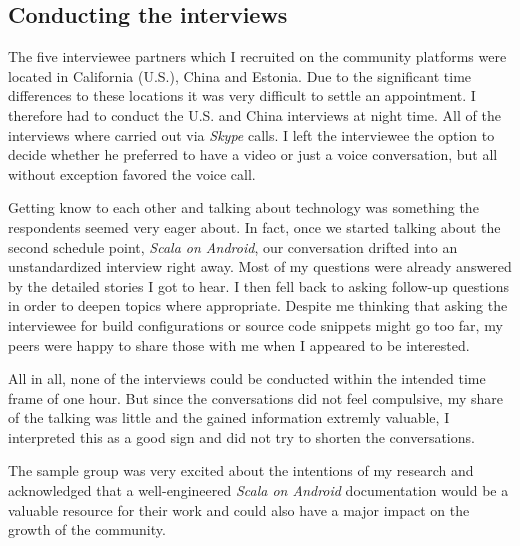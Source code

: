 \subsection{Conducting the interviews}

The five interviewee partners which I recruited on the community platforms were located in California (U.S.), China and Estonia. Due to the significant time differences to these locations it was very difficult to settle an appointment. I therefore had to conduct the U.S. and China interviews at night time. All of the interviews where carried out via \textit{Skype} calls. I left the interviewee the option to decide whether he preferred to have a video or just a voice conversation, but all without exception favored the voice call.

Getting know to each other and talking about technology was something the respondents seemed very eager about. In fact, once we started talking about the second schedule point, \textit{Scala on Android}, our conversation drifted into an unstandardized interview right away. Most of my questions were already answered by the detailed stories I got to hear. I then fell back to asking follow-up questions in order to deepen topics where appropriate. Despite me thinking that asking the interviewee for build configurations or source code snippets might go too far, my peers were happy to share those with me when I appeared to be interested.

All in all, none of the interviews could be conducted within the intended time frame of one hour. But since the conversations did not feel compulsive, my share of the talking was little and the gained information extremly valuable, I interpreted this as a good sign and did not try to shorten the conversations.

The sample group was very excited about the intentions of my research and acknowledged that a well-engineered \textit{Scala on Android} documentation would be a valuable resource for their work and could also have a major impact on the growth of the community.